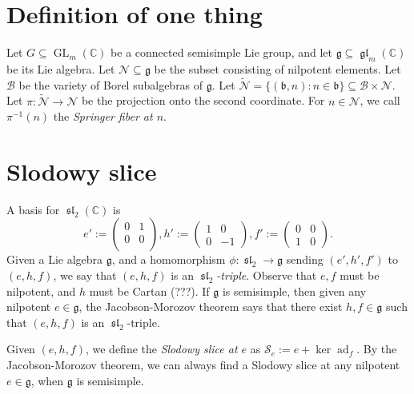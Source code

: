 \documentclass[12pt,psamsfonts]{article}
\DeclareMathOperator{\GL}{GL}
\DeclareMathOperator{\gl}{\mathfrak{gl}}
\DeclareMathOperator{\spl}{\mathfrak{sl}}
\DeclareMathOperator{\ad}{ad}
\begin{document}
\section{Definition of one thing}
Let \(G \subseteq \GL_m(\mathbb{C})\) be a connected semisimple Lie group, and let \(\mathfrak{g} \subseteq \gl_m(\mathbb{C})\) be its Lie algebra.
Let \(\mathcal{N} \subseteq \mathfrak{g}\) be the subset consisting of nilpotent elements.
Let \(\mathcal{B}\) be the variety of Borel subalgebras of \(\mathfrak{g}\).
Let \(\widetilde{\mathcal{N}} = \{(\mathfrak{b}, n) : n \in \mathfrak{b}\} \subseteq \mathcal{B} \times \mathcal{N}\).
Let \(\pi : \widetilde{\mathcal{N}} \to \mathcal{N}\) be the projection onto the second coordinate.
For \(n \in \mathcal{N}\), we call \(\pi^{-1}(n)\) the \emph{Springer fiber at \(n\)}.

\section{Slodowy slice}
A basis for \(\spl_2(\mathbb{C})\) is
\[e' := \begin{pmatrix}0 & 1 \\ 0 & 0 \\\end{pmatrix}, h' := \begin{pmatrix}1 & 0 \\0 & -1\end{pmatrix}, f' := \begin{pmatrix}0 & 0 \\1 & 0\end{pmatrix}.\]
Given a Lie algebra \(\mathfrak{g}\), and a homomorphism \(\phi : \spl_2 \to \mathfrak{g}\) sending \((e', h', f')\) to \((e, h, f)\), we say that \((e, h, f)\) is an \emph{\(\spl_2\)-triple}.
Observe that \(e, f\) must be nilpotent, and \(h\) must be Cartan (???).
If \(\mathfrak{g}\) is semisimple, then given any nilpotent \(e \in \mathfrak{g}\), the Jacobson-Morozov theorem \cite[3.7.1]{ehf} says that there exist \(h, f \in \mathfrak{g}\) such that \((e, h, f)\) is an \(\spl_2\)-triple.
\par Given \((e, h, f)\), we define the \emph{Slodowy slice at \(e\)} as \(\mathcal{S}_e := e + \ker \ad_f\).
By the Jacobson-Morozov theorem, we can always find a Slodowy slice at any nilpotent \(e \in \mathfrak{g}\), when \(\mathfrak{g}\) is semisimple.
\end{document}
